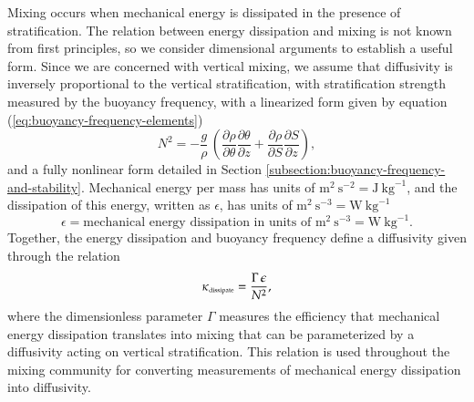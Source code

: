 Mixing occurs when mechanical energy is dissipated in the presence of
stratification.  The relation between energy dissipation and mixing is
not known from first principles, so we consider dimensional arguments
to establish a useful form.  Since we are concerned with vertical
mixing, we assume that diffusivity is inversely proportional to the
vertical stratification, with stratification strength measured by the
buoyancy frequency, with a linearized form given by equation
(\ref{eq:buoyancy-frequency-elements})
\begin{equation}
N^{2} =  -\frac{g}{\rho} \, \left( 
   \frac{\partial \rho}{\partial \theta} \frac{\partial \theta}{\partial z}  
  +
   \frac{\partial \rho}{\partial S} \frac{\partial S}{\partial z}
\right), 
\end{equation}
and a fully nonlinear form detailed in Section
\ref{subsection:buoyancy-frequency-and-stability}.  Mechanical energy
per mass has units of $\mbox{m}^{2}~\mbox{s}^{-2} =
\mbox{J}~\mbox{kg}^{-1}$, and the dissipation of this energy, written
as $\epsilon$, has units of $\mbox{m}^{2}~\mbox{s}^{-3} =
\mbox{W}~\mbox{kg}^{-1}$
\begin{equation}
\epsilon = \mbox{mechanical energy dissipation in units of
 $\mbox{m}^{2}~\mbox{s}^{-3} = \mbox{W}~\mbox{kg}^{-1}$.}
\label{eq:energy-dissipation-epsilon}
\end{equation}
Together, the energy dissipation and buoyancy frequency define a
diffusivity given through the relation \citep{Osborn1980}
\begin{equation}
  \kappa_{\mbox{\tiny dissipate}} = \frac{\Gamma \, \epsilon}{N^{2}},
\label{eq:osborn-relation}
\end{equation} 
where the dimensionless parameter $\Gamma$ measures the efficiency
that mechanical energy dissipation translates into mixing that can be
parameterized by a diffusivity acting on vertical stratification.
This relation is used throughout the mixing community for converting
measurements of mechanical energy dissipation into diffusivity.

